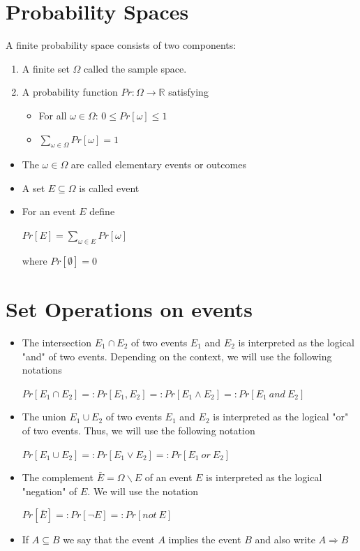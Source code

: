 	\section{Probability Spaces}
		A finite probability space consists of two components:
		\begin{enumerate}
			\item A finite set $\Omega$ called the sample space.
			\item A probability function $Pr: \Omega \to \mathbb{R}$ satisfying
				\begin{itemize}
					\item For all $\omega \in \Omega$: $0 \leq Pr[\omega] \leq 1$
					\item $\sum\limits_{\omega \in \Omega} Pr[\omega] = 1$
				\end{itemize}
		\end{enumerate}
		\begin{itemize}
			\item The $\omega\in \Omega$ are called elementary events or outcomes
			\item A set $E \subseteq \Omega$ is called event
			\item For an event $E$ define
				\begin{center}
					$Pr[E] = \sum\limits_{\omega \in E} Pr[\omega]$
				\end{center}
				where $Pr[\emptyset] = 0$
		\end{itemize}
	
	\section{Set Operations on events}
		\begin{itemize}
			\item The intersection $E_1 \cap E_2$ of two events $E_1$ and $E_2$ is interpreted as the logical "and" of two events.
			Depending on the context, we will use the following notations
			\begin{center}
				$Pr[E_1 \cap E_2] =: Pr[E_1,E_2] =: Pr[E_1 \wedge E_2] =: Pr[E_1 \  and \  E_2]$
			\end{center}
			\item The union $E_1 \cup E_2$ of two events $E_1$ and $E_2$ is interpreted as the logical "or" of two events.
			Thus, we will use the following notation
			\begin{center}
				$Pr[E_1 \cup E_2] =: Pr[E_1 \vee E_2] =: Pr[E_1 \  or \  E_2]$
			\end{center}
			\item The complement $\bar{E} = \Omega \backslash E$ of an event $E$ is interpreted as the logical "negation" of $E$.
			We will use the notation
			\begin{center}
				$Pr[\bar{E}] =: Pr[\neg E] =: Pr[not \  E]$
			\end{center}
			\item If $A \subseteq B$ we say that the event $A$ implies the event $B$ and also write $A \Rightarrow B$
		\end{itemize}
	

